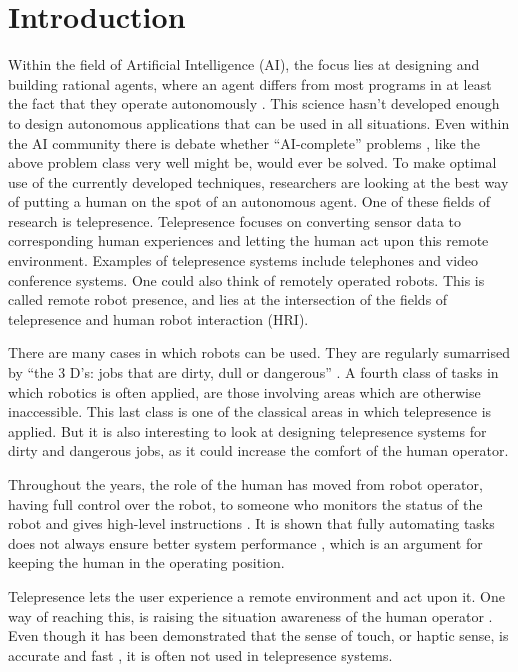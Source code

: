 \chapter{Introduction}
Within the field of Artificial Intelligence (AI), the focus lies at designing
and building rational agents, where an agent differs from most programs in at
least the fact that they operate autonomously \cite[p.4]{Russel2003}.  This
science hasn't developed enough to design autonomous applications that can be
used in all situations.  Even within the AI community there is debate whether
``AI-complete'' problems \cite[p.738]{Jurafsky2000}, like the above problem
class very well might be,  would ever be solved.  To make optimal use of the
currently developed techniques, researchers are looking at the best way of
putting a human on the spot of an autonomous agent.  One of these fields of
research is telepresence.  Telepresence focuses on converting sensor data to
corresponding human experiences and letting the human act upon this remote
environment.  Examples of telepresence systems include telephones and video
conference systems. One could also think of remotely operated robots.  This is
called remote robot presence, and lies at
the intersection of the fields of telepresence and human robot
interaction
(HRI).

There are many cases in which robots can be used. They are regularly
sumarrised by ``the 3 D's: jobs that are dirty, dull or dangerous''
\cite[p.6]{Murphy2000}.  A fourth class of tasks in which robotics is often
applied, are those involving areas which are otherwise inaccessible. This last
class is one of the classical areas in which telepresence is applied.  But it
is also interesting to look at designing telepresence systems for dirty
and dangerous jobs, as it could increase the comfort of the human operator.

Throughout the years, the role of the human has moved from robot operator,
having full control over the robot, to someone who monitors the status of the
robot and gives high-level instructions \cite{VanErp2006}.  It is shown that
fully automating tasks does not always ensure better system performance
\cite{VanErp2000}, which is an argument for keeping the human in the operating
position.

Telepresence lets the user experience a remote environment and act upon it.
One way of reaching this, is raising the situation awareness of the human
operator \cite{Endsley1988,VanErp2006}.  Even though it has been demonstrated
that the sense of touch, or haptic sense, is accurate and fast
\cite{Klatzky1985}, it is often not used in telepresence systems.  

